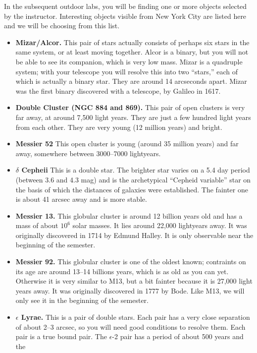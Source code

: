 
\noindent In the subsequent outdoor labs, you will be finding one or
more objects selected by the instructor. Interesting objects visible
from New York City are listed here and we will be choosing from this
list.

\begin{itemize}  
\item {\bf Mizar/Alcor.} This pair of stars actually  consists of
perhaps six stars in the same system, or at least moving
together. Alcor is a binary, but you will not be able to see its
companion, which is very low mass. Mizar is a quadruple system; with
your telescope you will resolve this into two ``stars,'' each of which
is actually a binary star. They are around 14 arcseconds apart. Mizar
was the first binary discovered with a telescope, by Galileo in 1617.
\item {\bf Double Cluster (NGC 884 and 869).} This pair of open
  clusters is very far away, at around 7,500 light years. They are
  just a few hundred light years from each other. They are very young
  (12 million years) and bright.
\item {\bf Messier 52} This open cluster is young (around 35 million
  years) and far away, somewhere between 3000--7000 lightyears.
\item {\bf $\delta$ Cepheii} This is a double star. The brighter star
varies on a 5.4 day period (between 3.6 and 4.3 mag) and is the
  archetypical ``Cepheid variable'' star on the basis of which the
  distances of galaxies were established. The fainter one is about 41
  arcsec away and is more stable.
\item {\bf Messier 13.}
  This globular cluster is around 12 billion years old and has a mass
  of about $10^6$ solar masses. It lies around 22,000 lightyears
  away. It was originally discovered in 1714 by Edmund Halley. It is
  only observable near the beginning of the semester.
\item {\bf Messier 92.}
  This globular cluster is one of the oldest known; contraints on its
  age are around 13--14 billions years, which is as old as you can
  yet. Otherwise it is very similar to M13, but a bit fainter because
  it is 27,000 light years away. It was originally discovered in 1777
  by Bode. Like M13, we will only see it in the beginning of the
  semester.
\item {\bf $\epsilon$ Lyrae.} This is a pair of double stars. 
Each pair has a very close separation of about 2--3 arcsec, so you
  will need good conditions to resolve them. Each pair is a true bound
  pair. The $\epsilon$-2 pair has a period of about 500 years and the

\end{itemize}
